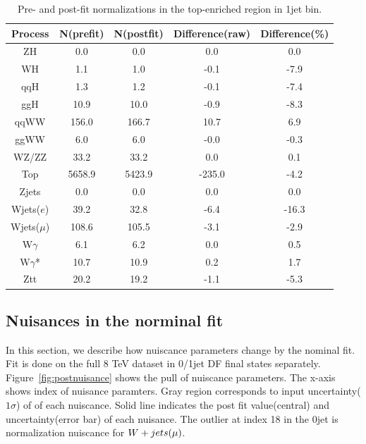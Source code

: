 \begin{table}[ht!]
\begin{center}
\begin{tabular}{c|cc|cc}
\hline
\hline
Process     &    N(prefit) &   N(postfit) & Difference(raw) &  Difference(\%)  \\  
\hline
\hline
ZH          &        0.0 &        0.0 &        0.0 &        0.0        \\
WH          &        1.1 &        1.0 &       -0.1 &       -7.9        \\
qqH         &        1.3 &        1.2 &       -0.1 &       -7.4        \\
ggH         &       10.9 &       10.0 &       -0.9 &       -8.3        \\
\hline
qqWW        &      156.0 &      166.7 &       10.7 &        6.9        \\
ggWW        &        6.0 &        6.0 &       -0.0 &       -0.3        \\
\hline
WZ/ZZ       &       33.2 &       33.2 &        0.0 &        0.1        \\
\hline
Top         &     5658.9 &     5423.9 &     -235.0 &       -4.2        \\
\hline
Zjets       &        0.0 &        0.0 &        0.0 &        0.0        \\
\hline
Wjets($e$)  &       39.2 &       32.8 &       -6.4 &      -16.3        \\
Wjets($\mu$)&      108.6 &      105.5 &       -3.1 &       -2.9        \\
\hline
W$\gamma$   &        6.1 &        6.2 &        0.0 &        0.5        \\
W$\gamma$*  &       10.7 &       10.9 &        0.2 &        1.7        \\
\hline
Ztt         &       20.2 &       19.2 &       -1.1 &       -5.3        \\
\hline
\hline
\end{tabular}
\caption{Pre- and post-fit normalizations in the top-enriched region in 1jet bin.}
\label{tab:fitval_norm_top_1j}
\end{center}
\end{table}


\subsection{Nuisances in the norminal fit}
In this section, we describe how nuiscance parameters change by the nominal fit. 
Fit is done on the full 8 TeV dataset in 0/1jet DF final states separately. 
Figure~\ref{fig:postnuisance} shows the pull of nuiscance parameters. The x-axis shows 
index of nuisance paramters. Gray region corresponds to input uncertainty($1\sigma$) of  
of each nuiscance. Solid line indicates the post fit value(central) and uncertainty(error bar)
of each nuisance. The outlier at index 18 in the 0jet is normalization nuiscance for 
$W+jets(\mu)$.

